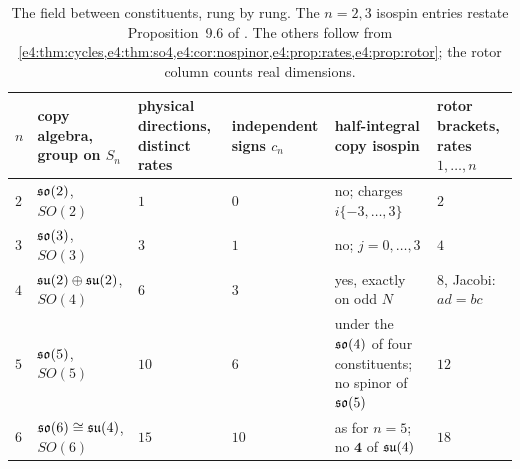 \begin{table}[htbp]
\centering
\footnotesize
\begin{tabular}{@{}>{\raggedright\arraybackslash}p{0.4cm}>{\raggedright\arraybackslash}p{2.6cm}>{\raggedright\arraybackslash}p{2.0cm}>{\raggedright\arraybackslash}p{1.8cm}>{\raggedright\arraybackslash}p{3.8cm}>{\raggedright\arraybackslash}p{2.3cm}@{}}
\toprule
$n$ & copy algebra, group on $S_n$ & physical directions, distinct rates & independent signs $c_n$ & half-integral copy isospin & rotor brackets, rates $1,\dots,n$\\
\midrule
$2$ & $\mathfrak{so}(2)$, $SO(2)$ & $1$ & $0$ & no; charges $i\{-3,\dots,3\}$ & $2$\\
$3$ & $\mathfrak{so}(3)$, $SO(3)$ & $3$ & $1$ & no; $j=0,\dots,3$ & $4$\\
$4$ & $\mathfrak{su}(2)\oplus\mathfrak{su}(2)$, $SO(4)$ & $6$ & $3$ & yes, exactly on odd $N$ & $8$, Jacobi: $ad=bc$\\
$5$ & $\mathfrak{so}(5)$, $SO(5)$ & $10$ & $6$ & under the $\mathfrak{so}(4)$ of four constituents; no spinor of $\mathfrak{so}(5)$ & $12$\\
$6$ & $\mathfrak{so}(6)\cong\mathfrak{su}(4)$, $SO(6)$ & $15$ & $10$ & as for $n=5$; no $\mathbf 4$ of $\mathfrak{su}(4)$ & $18$\\
\bottomrule
\end{tabular}
\caption{The field between constituents, rung by rung. The $n=2,3$ isospin entries restate Proposition~9.6 of \cite{RE}. The others follow from
\cref{e4:thm:cycles,e4:thm:so4,e4:cor:nospinor,e4:prop:rates,e4:prop:rotor}; the rotor column counts real dimensions.}
\label{e4:tab:ladder}
\end{table}

